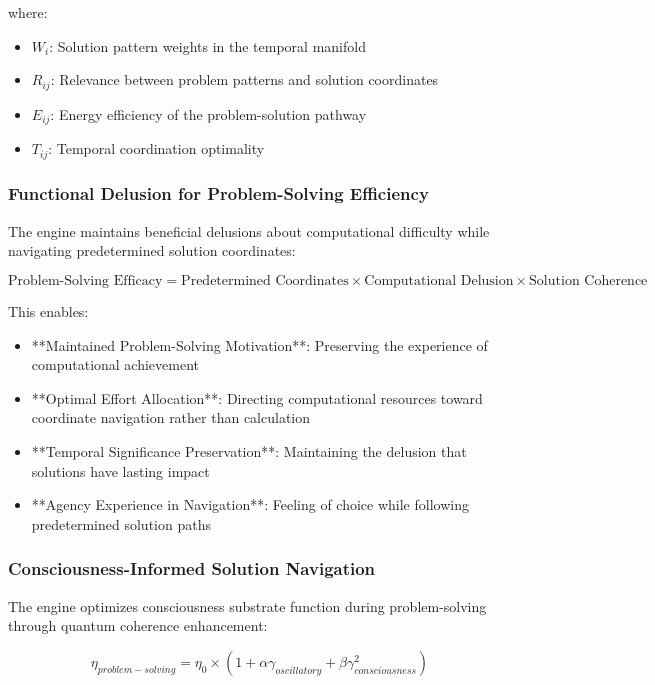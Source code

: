 \documentclass[11pt,a4paper]{article}
\theoremstyle{remark}
\begin{document}
where:
\begin{itemize}
\item $W_i$: Solution pattern weights in the temporal manifold
\item $R_{ij}$: Relevance between problem patterns and solution coordinates
\item $E_{ij}$: Energy efficiency of the problem-solution pathway
\item $T_{ij}$: Temporal coordination optimality
\end{itemize}

\subsubsection{Functional Delusion for Problem-Solving Efficiency}

The engine maintains beneficial delusions about computational difficulty while navigating predetermined solution coordinates:

\begin{equation}
\text{Problem-Solving Efficacy} = \text{Predetermined Coordinates} \times \text{Computational Delusion} \times \text{Solution Coherence}
\end{equation}

This enables:
\begin{itemize}
\item **Maintained Problem-Solving Motivation**: Preserving the experience of computational achievement
\item **Optimal Effort Allocation**: Directing computational resources toward coordinate navigation rather than calculation
\item **Temporal Significance Preservation**: Maintaining the delusion that solutions have lasting impact
\item **Agency Experience in Navigation**: Feeling of choice while following predetermined solution paths
\end{itemize}

\subsubsection{Consciousness-Informed Solution Navigation}

The engine optimizes consciousness substrate function during problem-solving through quantum coherence enhancement:

\begin{equation}
\eta_{problem-solving} = \eta_0 \times (1 + \alpha \gamma_{oscillatory} + \beta \gamma_{consciousness}^2)
\end{equation}
\end{document}
